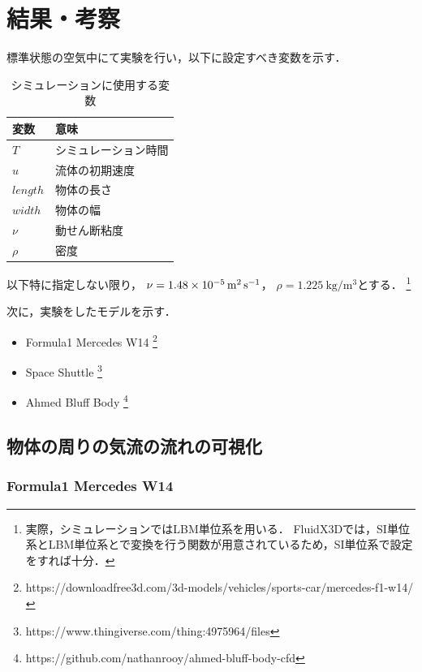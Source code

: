 \documentclass[main]{subfiles}
\begin{document}
\chapter{結果・考察}

標準状態の空気中にて実験を行い，以下に設定すべき変数を示す．
\begin{table}[ht]
    \centering
    \caption{シミュレーションに使用する変数}
    \begin{tabular}{ll}
        \toprule
        変数       & 意味         \\
        \midrule
        $T$      & シミュレーション時間 \\
        $u$      & 流体の初期速度    \\
        $length$ & 物体の長さ      \\
        $width$  & 物体の幅       \\
        $\nu$    & 動せん断粘度     \\
        $\rho$   & 密度         \\
        \bottomrule
    \end{tabular}%
    \label{tab:result-variables}%
\end{table}

以下特に指定しない限り，
$\nu=\SI{1.48E-5}{\square\meter\per\second}$，
$\rho=\SI{1.225}{\kilogram\per\cubic\meter}$とする．
\footnote{
    実際，シミュレーションではLBM単位系を用いる．
    FluidX3Dでは，SI単位系とLBM単位系とで変換を行う関数が用意されているため，SI単位系で設定をすれば十分．
}

次に，実験をしたモデルを示す．

\begin{itemize}
    \item Formula1 Mercedes W14 \footnote{https://downloadfree3d.com/3d-models/vehicles/sports-car/mercedes-f1-w14/}
    \item Space Shuttle \footnote{https://www.thingiverse.com/thing:4975964/files}
    \item Ahmed Bluff Body \footnote{https://github.com/nathanrooy/ahmed-bluff-body-cfd}
\end{itemize}

\clearpage
\section{物体の周りの気流の流れの可視化}
\subsection{Formula1 Mercedes W14}

\end{document}
